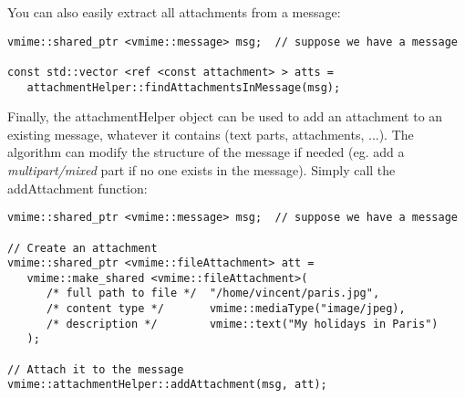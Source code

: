 You can also easily extract all attachments from a message:

\begin{lstlisting}[caption={Extracting all attachments from a message}]
vmime::shared_ptr <vmime::message> msg;  // suppose we have a message

const std::vector <ref <const attachment> > atts =
   attachmentHelper::findAttachmentsInMessage(msg);
\end{lstlisting}

Finally, the {\vcode attachmentHelper} object can be used to add an
attachment to an existing message, whatever it contains (text parts,
attachments, ...). The algorithm can modify the structure of the
message if needed (eg. add a \emph{multipart/mixed} part if no one
exists in the message). Simply call the {\vcode addAttachment}
function:

\begin{lstlisting}[caption={Adding an attachment to an existing message}]
vmime::shared_ptr <vmime::message> msg;  // suppose we have a message

// Create an attachment
vmime::shared_ptr <vmime::fileAttachment> att =
   vmime::make_shared <vmime::fileAttachment>(
      /* full path to file */  "/home/vincent/paris.jpg",
      /* content type */       vmime::mediaType("image/jpeg),
      /* description */        vmime::text("My holidays in Paris")
   );

// Attach it to the message
vmime::attachmentHelper::addAttachment(msg, att);
\end{lstlisting}

